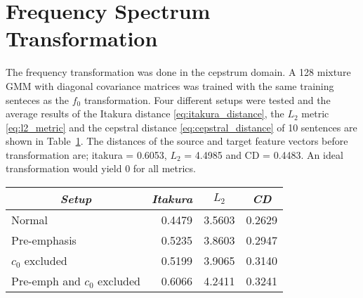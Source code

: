 \section{Frequency Spectrum Transformation} %
\label{sec:frequency_transformation}
The frequency transformation was done in the cepstrum domain. A 128 mixture GMM with diagonal covariance matrices was trained with the same training senteces as the $f_0$ transformation. Four different setups were tested and the average results of the Itakura distance \eqref{eq:itakura_distance}, the $L_2$ metric \eqref{eq:l2_metric} and the cepstral distance \eqref{eq:cepstral_distance} of 10 sentences are shown in Table~\ref{tab:absolute_freq_results}. The distances of the source and target feature vectors before transformation are; itakura = 0.6053, $L_2$ = 4.4985 and CD = 0.4483. An ideal transformation would yield 0 for all metrics.
\begin{table}[htbp]
	\begin{center}
		\label{tab:absolute_freq_results}
		\begin{tabular}{lrrr}
			\toprule
			\multicolumn{1}{c}{\emph{Setup}} & \multicolumn{1}{c}{\emph{Itakura}} & \multicolumn{1}{c}{\emph{$L_2$}} & \multicolumn{1}{c}{\emph{CD}}\\
			\midrule
			Normal &  0.4479 & 3.5603 & 0.2629 \\
			Pre-emphasis & 0.5235 & 3.8603 & 0.2947 \\
			$c_0$ excluded & 0.5199 & 3.9065 & 0.3140 \\
			Pre-emph and $c_0$ excluded & 0.6066 & 4.2411 & 0.3241 \\
			\bottomrule			
		\end{tabular}		
	\end{center}	
\end{table}



